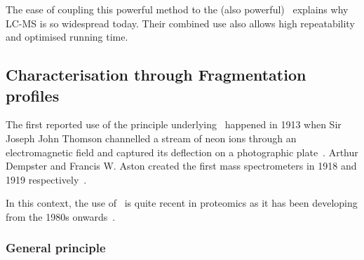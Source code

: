 \vspace{-0.5mm}
The ease of coupling this powerful method to the (also powerful) \ms\ explains
why \gls{LC-MS} is so widespread today. Their combined use also allows high
repeatability and optimised running time.
\vspace{-1mm}

\subsection{Characterisation through Fragmentation profiles}
\vspace{-3mm}

The first reported use of the principle underlying \ms\ happened in 1913 when
Sir Joseph John Thomson channelled a stream of neon ions through an electromagnetic
field and captured its deflection on a photographic plate~.
Arthur Dempster and Francis W. Aston created the first mass spectrometers in 1918
and 1919 respectively~.
\begin{comment}
\ms\ became rapidly a pillar
of the so-called \emph{modern analytical techniques} in Chemistry as it allows
for a large spectrum of molecules of interest, the detection,
the characterisation and even, for the smaller ones, the resolution of their
structures.
\end{comment}
In this context, the use of \ms\ is quite recent in proteomics
as it has been developing from the 1980s onwards~.

\subsubsection{General principle}

